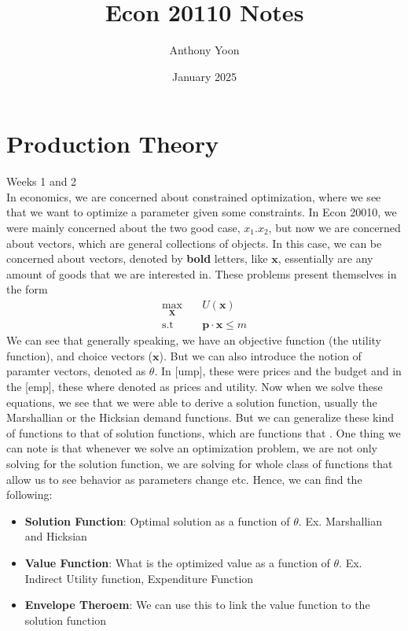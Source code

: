 \documentclass[12pt]{article}
\title{Econ 20110 Notes}
\author{Anthony Yoon}
\date{January 2025}
\newcommand{\st}{\text{s.t}}
\begin{document}
\maketitle
\tableofcontents
\section{Production Theory}
Weeks 1 and 2\\
In economics, we are concerned about constrained optimization, where we see that we want to optimize a parameter given some constraints. In Econ 20010, we were mainly concerned about the two good case, $x_1. x_2$, but now we are concerned about vectors, which are general collections of objects. In this case, we can be concerned about vectors, denoted by \textbf{bold} letters, like $\mathbf{x}$, essentially are any amount of goods that we are interested in. These problems present themselves in the form 
\begin{align*}
    \max_{\mathbf{X}} & \quad U(\mathbf{x})\\
    \st & \quad \mathbf{p} \cdot \mathbf{x} \leq m
\end{align*}
We can see that generally speaking, we have an objective function (the utility function), and choice vectors ($\mathbf{x}$). But we can also introduce the notion of paramter vectors, denoted as $\theta$. In [ump], these were prices and the budget and in the [emp], these where denoted as prices and utility. Now when we solve these equations, we see that we were able to derive a solution function, usually the Marshallian or the Hicksian demand functions. But we can generalize these kind of functions to that of solution functions, which are functions that . One thing we can note is that whenever we solve an optimization problem, we are not only solving for the solution function, we are solving for whole class of functions that allow us to see behavior as parameters change etc. Hence, we can find the following:
\begin{itemize}
    \item \textbf{Solution Function}: Optimal solution as a function of $\theta$. Ex. Marshallian and Hicksian
    \item \textbf{Value Function}: What is the optimized value as a function of $\theta$. Ex. Indirect Utility function, Expenditure Function
    \item \textbf{Envelope Theroem}: We can use this to link the value function to the solution function
\end{itemize}
\end{document}

